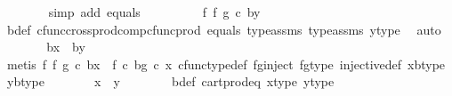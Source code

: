 \begin{isabellebody}
\ \ \ \ \ \ \isamarkupfalse%
\ {\isacharparenleft}{\kern0pt}simp\ add{\isacharcolon}{\kern0pt}\ equals{\isacharparenright}{\kern0pt}\isanewline
\ \ \ \ \isamarkupfalse%
\ \isamarkupfalse%
\ {\isachardoublequoteopen}{\isachardot}{\kern0pt}{\isachardot}{\kern0pt}{\isachardot}{\kern0pt}\ {\isacharequal}{\kern0pt}\ {\isacharparenleft}{\kern0pt}f\ {\isasymtimes}\isactrlsub f\ g{\isacharparenright}{\kern0pt}\ {\isasymcirc}\isactrlsub c\ {\isasymlangle}b{\isacharcomma}{\kern0pt}y{\isasymrangle}{\isachardoublequoteclose}\isanewline
\ \ \ \ \ \ \isamarkupfalse%
\ b{\isacharunderscore}{\kern0pt}def\ cfunc{\isacharunderscore}{\kern0pt}cross{\isacharunderscore}{\kern0pt}prod{\isacharunderscore}{\kern0pt}comp{\isacharunderscore}{\kern0pt}cfunc{\isacharunderscore}{\kern0pt}prod\ equals\ type{\isacharunderscore}{\kern0pt}assms{\isacharparenleft}{\kern0pt}{}{\isacharparenright}{\kern0pt}\ type{\isacharunderscore}{\kern0pt}assms{\isacharparenleft}{\kern0pt}{}{\isacharparenright}{\kern0pt}\ y{\isacharunderscore}{\kern0pt}type{}\ \isamarkupfalse%
\ auto\isanewline
\ \ \ \ \isamarkupfalse%
\ \isamarkupfalse%
\ {\isachardoublequoteopen}{\isasymlangle}b{\isacharcomma}{\kern0pt}x{\isasymrangle}\ {\isacharequal}{\kern0pt}\ {\isasymlangle}b{\isacharcomma}{\kern0pt}y{\isasymrangle}{\isachardoublequoteclose}\isanewline
\ \ \ \ \ \ \isamarkupfalse%
\ {\isacharparenleft}{\kern0pt}metis\ {\isacartoucheopen}{\isacharparenleft}{\kern0pt}f\ {\isasymtimes}\isactrlsub f\ g{\isacharparenright}{\kern0pt}\ {\isasymcirc}\isactrlsub c\ {\isasymlangle}b{\isacharcomma}{\kern0pt}x{\isasymrangle}\ {\isacharequal}{\kern0pt}\ {\isasymlangle}f\ {\isasymcirc}\isactrlsub c\ b{\isacharcomma}{\kern0pt}g\ {\isasymcirc}\isactrlsub c\ x{\isasymrangle}{\isacartoucheclose}\ cfunc{\isacharunderscore}{\kern0pt}type{\isacharunderscore}{\kern0pt}def\ fg{\isacharunderscore}{\kern0pt}inject\ fg{\isacharunderscore}{\kern0pt}type\ injective{\isacharunderscore}{\kern0pt}def\ xb{\isacharunderscore}{\kern0pt}type\ yb{\isacharunderscore}{\kern0pt}type{\isacharparenright}{\kern0pt}\isanewline
\ \ \ \ \isamarkupfalse%
\ \isamarkupfalse%
\ {\isachardoublequoteopen}x\ {\isacharequal}{\kern0pt}\ y{\isachardoublequoteclose}\isanewline
\ \ \ \ \ \ \isamarkupfalse%
\ b{\isacharunderscore}{\kern0pt}def\ cart{\isacharunderscore}{\kern0pt}prod{\isacharunderscore}{\kern0pt}eq{}\ x{\isacharunderscore}{\kern0pt}type{}\ y{\isacharunderscore}{\kern0pt}type{}\ \isamarkupfalse%

\end{isabellebody}
